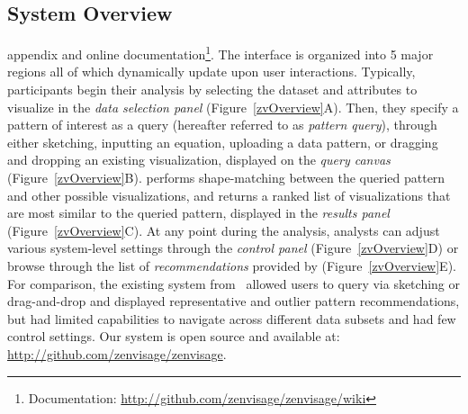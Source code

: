  \subsection{System Overview\label{sec:system}}%
  appendix and online documentation\footnote{Documentation: \url{http://github.com/zenvisage/zenvisage/wiki}}. The \zvpp interface is organized into 5 major regions all of which dynamically update upon user interactions. Typically, participants begin their analysis by selecting the dataset and attributes to visualize in the \emph{data selection panel} (Figure~\ref{zvOverview}A). Then, they specify a pattern of interest as a query (hereafter referred to as \emph{pattern query}), through either sketching, inputting an equation, uploading a data pattern, or dragging and dropping an existing visualization, displayed on the \emph{query canvas} (Figure~\ref{zvOverview}B). \zvpp performs shape-matching between the queried pattern and other possible visualizations, and returns a ranked list of visualizations that are most similar to the queried pattern, displayed in the \emph{results panel} (Figure~\ref{zvOverview}C). At any point during the analysis, analysts can adjust various system-level settings through the \emph{control panel} (Figure~\ref{zvOverview}D) or browse through the list of \emph{recommendations} provided by \zvpp (Figure~\ref{zvOverview}E). For comparison, the existing \zv system from~\cite{Siddiqui2017} allowed users to query via sketching or drag-and-drop and displayed representative and outlier pattern recommendations, but had limited capabilities to navigate across different data subsets and had few control settings. Our \zvpp system is open source and available at: \url{http://github.com/zenvisage/zenvisage}. %
